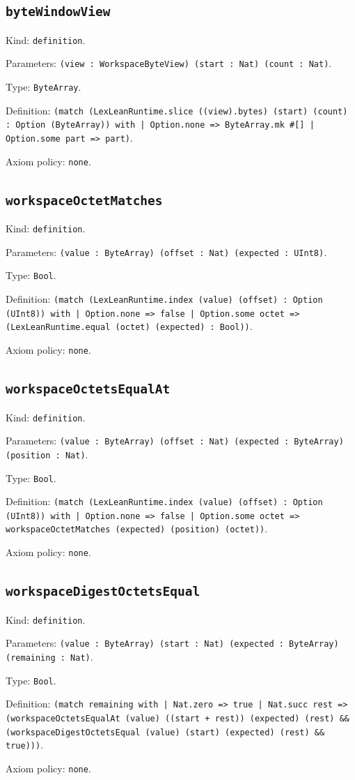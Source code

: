\documentclass[11pt]{article}
\begin{document}
\subsection*{\texttt{byteWindowView}}
\noindent Kind: \texttt{definition}.\par
\noindent Parameters: \texttt{(view : WorkspaceByteView) (start : Nat) (count : Nat)}.\par
\noindent Type: \texttt{ByteArray}.\par
\noindent Definition: \texttt{(match (LexLeanRuntime.slice ((view).bytes) (start) (count) : Option (ByteArray)) with | Option.none => ByteArray.mk \#[] | Option.some part => part)}.\par
\noindent Axiom policy: \texttt{none}.\par
\subsection*{\texttt{workspaceOctetMatches}}
\noindent Kind: \texttt{definition}.\par
\noindent Parameters: \texttt{(value : ByteArray) (offset : Nat) (expected : UInt8)}.\par
\noindent Type: \texttt{Bool}.\par
\noindent Definition: \texttt{(match (LexLeanRuntime.index (value) (offset) : Option (UInt8)) with | Option.none => false | Option.some octet => (LexLeanRuntime.equal (octet) (expected) : Bool))}.\par
\noindent Axiom policy: \texttt{none}.\par
\subsection*{\texttt{workspaceOctetsEqualAt}}
\noindent Kind: \texttt{definition}.\par
\noindent Parameters: \texttt{(value : ByteArray) (offset : Nat) (expected : ByteArray) (position : Nat)}.\par
\noindent Type: \texttt{Bool}.\par
\noindent Definition: \texttt{(match (LexLeanRuntime.index (value) (offset) : Option (UInt8)) with | Option.none => false | Option.some octet => workspaceOctetMatches (expected) (position) (octet))}.\par
\noindent Axiom policy: \texttt{none}.\par
\subsection*{\texttt{workspaceDigestOctetsEqual}}
\noindent Kind: \texttt{definition}.\par
\noindent Parameters: \texttt{(value : ByteArray) (start : Nat) (expected : ByteArray) (remaining : Nat)}.\par
\noindent Type: \texttt{Bool}.\par
\noindent Definition: \texttt{(match remaining with | Nat.zero => true | Nat.succ rest => (workspaceOctetsEqualAt (value) ((start + rest)) (expected) (rest) \&\& (workspaceDigestOctetsEqual (value) (start) (expected) (rest) \&\& true)))}.\par
\noindent Axiom policy: \texttt{none}.\par
\end{document}
